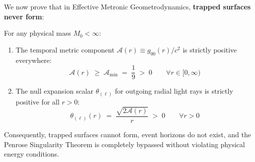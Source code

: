 \documentclass[
    12pt,
    a4paper,
    headings=normal,
    twoside=false,
    open=any,
    parskip=half
]{scrbook}
\begin{document}
We now prove that in Effective Metronic Geometrodynamics, \textbf{trapped surfaces never form}:

\begin{phystheorem}\label{thm:ch9_trapped_surface_avoidance}
For any physical mass $M_0 < \infty$:
\begin{enumerate}[label=(\alph*), noitemsep]
    \item The temporal metric component $\mathcal{A}(r) \equiv g_{00}(r)/c^2$ is strictly positive everywhere:
    \begin{equation}
    \boxed{\mathcal{A}(r) \;\ge\; \mathcal{A}_{\min} \;=\; \frac{1}{9} \;>\; 0 \qquad \forall r \in [0, \infty)}
    \label{eq:ch9_A_min_bound}
    \end{equation}
    \item The null expansion scalar $\theta_{(\ell)}$ for outgoing radial light rays is strictly positive for all $r > 0$:
    \begin{equation}
    \boxed{\theta_{(\ell)}(r) \;=\; \frac{\sqrt{2\mathcal{A}(r)}}{r} \;>\; 0 \qquad \forall r > 0}
    \label{eq:ch9_theta_expansion_positive}
    \end{equation}
\end{enumerate}
Consequently, trapped surfaces cannot form, event horizons do not exist, and the Penrose Singularity Theorem is completely bypassed without violating physical energy conditions.
\end{phystheorem}
\end{document}
